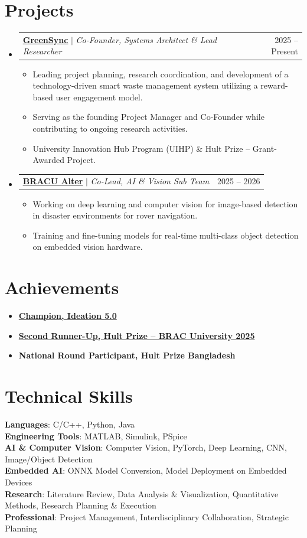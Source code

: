 \documentclass[letterpaper,11pt]{article}
\makeatletter
\newcommand{\resumeItem}[1]{\item\small{{#1 \vspace{-2pt}}}}
\newcommand{\resumeProjectHeading}[2]{
    \item
    \begin{tabular*}{0.97\textwidth}{l@{\extracolsep{\fill}}r}
      \small#1 & #2 \\
    \end{tabular*}\vspace{-7pt}
}
\newcommand{\resumeSingle}[1]{\vspace{-2pt}\item \textbf{#1}\vspace{-5pt}}
\newcommand{\resumeSubHeadingListStart}{\begin{itemize}[leftmargin=0.15in, label={}]}
\newcommand{\resumeSubHeadingListEnd}{\end{itemize}}
\newcommand{\resumeItemListStart}{\begin{itemize}}
\newcommand{\resumeItemListEnd}{\end{itemize}\vspace{-5pt}}
\makeatother
\begin{document}
\section{Projects}
    \resumeSubHeadingListStart
      \resumeProjectHeading{\textbf{\href{https://greensync.bd}{\underline{GreenSync}}} $|$ \emph{Co-Founder, Systems Architect \& Lead Researcher}}{2025 -- Present}
          \resumeItemListStart
            \resumeItem{Leading project planning, research coordination, and development of a technology-driven smart waste management system utilizing a reward-based user engagement model.}
            \resumeItem{Serving as the founding Project Manager and Co-Founder while contributing to ongoing research activities.}
            \resumeItem{University Innovation Hub Program (UIHP) \& Hult Prize -- Grant-Awarded Project.}
          \resumeItemListEnd
      \resumeProjectHeading{\textbf{\href{https://www.facebook.com/p/BRACU-ALTER-61557795005542/}{\underline{BRACU Alter}}} $|$ \emph{Co-Lead, AI \& Vision Sub Team}}{2025 -- 2026}
          \resumeItemListStart
            \resumeItem{Working on deep learning and computer vision for image-based detection in disaster environments for rover navigation.}
            \resumeItem{Training and fine-tuning models for real-time multi-class object detection on embedded vision hardware.}
          \resumeItemListEnd
    \resumeSubHeadingListEnd

\section{Achievements}
  \resumeSubHeadingListStart
    \resumeSingle{\href{https://engineering.bracu.ac.bd/news-details/engineering-student-research-team-bracu-alter-triumphs-as-champion-of-idea-innovation-50}{Champion, Ideation 5.0}}
    \resumeSingle{\href{https://www.facebook.com/photo?fbid=122110319301142814&set=pcb.122110319517142814}{Second Runner-Up, Hult Prize -- BRAC University 2025}}
    \resumeSingle{National Round Participant, Hult Prize Bangladesh}
  \resumeSubHeadingListEnd

\vspace{-7pt}
\section{Technical Skills}
 \begin{itemize}[leftmargin=0.15in, label={}]
    \small{\item{
     \textbf{Languages}{: C/C++, Python, Java} \\
     \textbf{Engineering Tools}{: MATLAB, Simulink, PSpice} \\
     \textbf{AI \& Computer Vision}{: Computer Vision, PyTorch, Deep Learning, CNN, Image/Object Detection} \\
     \textbf{Embedded AI}{: ONNX Model Conversion, Model Deployment on Embedded Devices} \\
     \textbf{Research}{: Literature Review, Data Analysis \& Visualization, Quantitative Methods, Research Planning \& Execution} \\
     \textbf{Professional}{: Project Management, Interdisciplinary Collaboration, Strategic Planning}
    }}
 \end{itemize}
\end{document}
